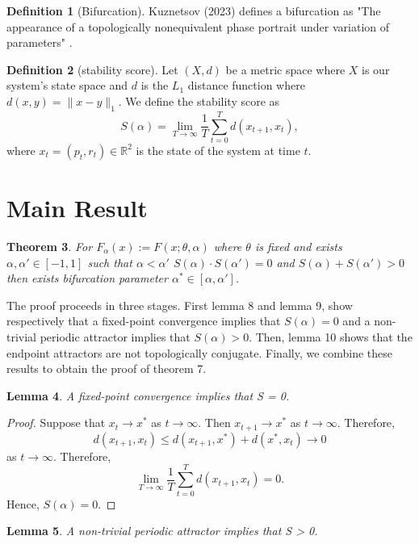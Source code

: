 \documentclass[11pt]{article}
\theoremstyle{plain}
\newtheorem{theorem}{Theorem}
\newtheorem{lemma}[theorem]{Lemma}
\theoremstyle{definition}
\newtheorem{definition}[theorem]{Definition}
\theoremstyle{remark}
\begin{document}
\begin{definition}[Bifurcation]
Kuznetsov (2023) defines a bifurcation as "The appearance of a topologically nonequivalent phase
portrait under variation of parameters" \citep{Kuznetsov2023}.
\end{definition}

\begin{definition}[stability score]
Let \((X, d)\) be a metric space where \(X\) is our system's state space and \(d\) is the \(L_1\) distance function where \(d(x, y) = \| x - y \|_1\).
We define the stability score as 
\[
S(\alpha) = \lim_{T \to \infty} \frac{1}{T} \sum_{t=0}^{T} d(x_{t+1}, x_t),
\]
where \(x_t = (p_t, r_t) \in \mathbb R^2\) is the state of the system at time \(t\).
\end{definition}

\section{Main Result}

\begin{theorem}
For \(F_\alpha(x) := F(x; \theta, \alpha)\) where \(\theta\) is fixed and exists \(\alpha, \alpha' \in [-1, 1]\) such that
\(\alpha < \alpha'\)
\(S(\alpha)\cdot S(\alpha') = 0\) and \(S(\alpha) + S(\alpha') > 0\) then exists bifurcation parameter \(\alpha^* \in [\alpha, \alpha']\).
\end{theorem}

The proof proceeds in three stages. First lemma 8 and lemma 9, show respectively that a fixed-point convergence implies that \(S(\alpha) = 0\)
and a non-trivial periodic attractor implies that \(S(\alpha) > 0\).
Then, lemma 10 shows that the endpoint attractors are not topologically conjugate. 
Finally, we combine these results to obtain the proof of theorem 7.

\begin{lemma}
A fixed-point convergence implies that S = 0.
\end{lemma}

\begin{proof}
Suppose that \(x_t \to x^*\) as \(t \to \infty\). Then \(x_{t+1} \to x^*\) as \(t \to \infty\). Therefore,
\[
d(x_{t+1}, x_t) \leq d(x_{t+1}, x^*) + d(x^*, x_t) \to 0
\]
as \(t \to \infty\). Therefore,
\[
\lim_{T \to \infty} \frac{1}{T} \sum_{t=0}^{T} d(x_{t+1}, x_t) = 0.
\]
Hence, \(S(\alpha) = 0\).
\end{proof}

\begin{lemma}
A non-trivial periodic attractor implies that S > 0.
\end{lemma}
\end{document}
